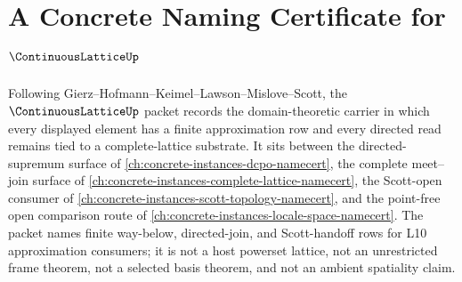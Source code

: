 \chapter{A Concrete Naming Certificate for $\ContinuousLatticeUp$}
\label{ch:concrete-instances-continuous-lattice-namecert}

Following Gierz--Hofmann--Keimel--Lawson--Mislove--Scott, the $\ContinuousLatticeUp$ packet records the domain-theoretic carrier in which every displayed element has a finite approximation row and every directed read remains tied to a complete-lattice substrate. It sits between the directed-supremum surface of \autoref{ch:concrete-instances-dcpo-namecert}, the complete meet--join surface of \autoref{ch:concrete-instances-complete-lattice-namecert}, the Scott-open consumer of \autoref{ch:concrete-instances-scott-topology-namecert}, and the point-free open comparison route of \autoref{ch:concrete-instances-locale-space-namecert}. The packet names finite way-below, directed-join, and Scott-handoff rows for L10 approximation consumers; it is not a host powerset lattice, not an unrestricted frame theorem, not a selected basis theorem, and not an ambient spatiality claim.

